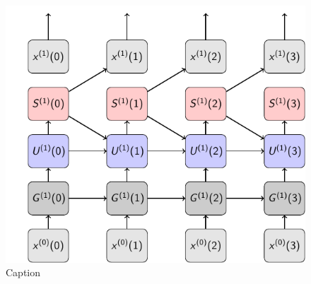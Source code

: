 \documentclass[journal,onecolumn,11pt]{IEEEtran}
\begin{document}
\begin{figure}
    \centering
    \includegraphics{figures/snn_graph.pdf}
    \caption{Caption}
    \label{fig:snn_compgraph}
\end{figure}
\end{document}
